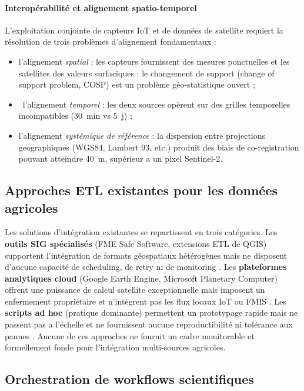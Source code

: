 \documentclass[12pt]{article}
\begin{document}
\paragraph{Interopérabilité et alignement spatio-temporel}
L'exploitation conjointe de capteurs IoT et de données de satellite requiert
la résolution de trois problèmes d'alignement fondamentaux :
\begin{itemize}
	\item [(i)] l'alignement \emph{spatial} : les capteurs fournissent des mesures
ponctuelles et les satellites des valeurs surfaciques : le changement
de support (change of support problem, COSP) est un problème géo-statistique
ouvert \cite{change_of_support} ;
\item [(ii)]~l'alignement \emph{temporel} : les deux sources opèrent sur des
grilles temporelles incompatibles (30~min vs 5~j) ;
\item [(iii)]l'alignement \emph{systémique de référence} : la dispersion
entre projections geographiques (WGS84, Lambert 93, etc.) produit des
biais de co-registration pouvant atteindre 40~m, supérieur a un pixel
Sentinel-2.
\end{itemize}

\subsection{Approches ETL existantes pour les données agricoles}

Les solutions d’intégration existantes se repartissent en trois catégories.
Les \textbf{outils SIG spécialisés} (FME Safe Software, extensions ETL
de QGIS) supportent l'intégration de formats géospatiaux hétérogènes
mais ne disposent d'aucune capacité de scheduling, de retry ni de
monitoring \cite{fme_agri}.
Les \textbf{plateformes analytiques cloud} (Google Earth Engine,
Microsoft Planetary Computer) offrent une puissance de calcul satellite
exceptionnelle mais imposent un enfermement propriétaire et n’intègrent
pas les flux locaux IoT ou FMIS \cite{gee_agriculture}.
Les \textbf{scripts ad hoc} (pratique dominante)  permettent un
prototypage rapide mais ne passent pas a l’échelle et ne fournissent
aucune reproductibilité ni tolérance aux pannes \cite{pipeline_survey_2024}.
Aucune de ces approches ne fournit un cadre monitorable et formellement
fonde pour l'intégration multi-sources agricoles.

\subsection{Orchestration de workflows scientifiques}
\end{document}

